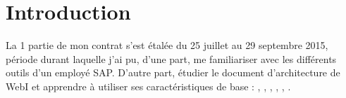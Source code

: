 \chapter*{Introduction}
La 1 partie de mon contrat s'est \'{e}tal\'{e}e du 25 juillet au 29 septembre 2015, p\'{e}riode durant laquelle j'ai pu, d'une part, me familiariser avec les diff\'{e}rents outils d'un employ\'{e} SAP. D'autre part, \'{e}tudier le document d'architecture de WebI et apprendre \`{a} utiliser ses caract\'{e}ristiques de base : , , , , , .\\